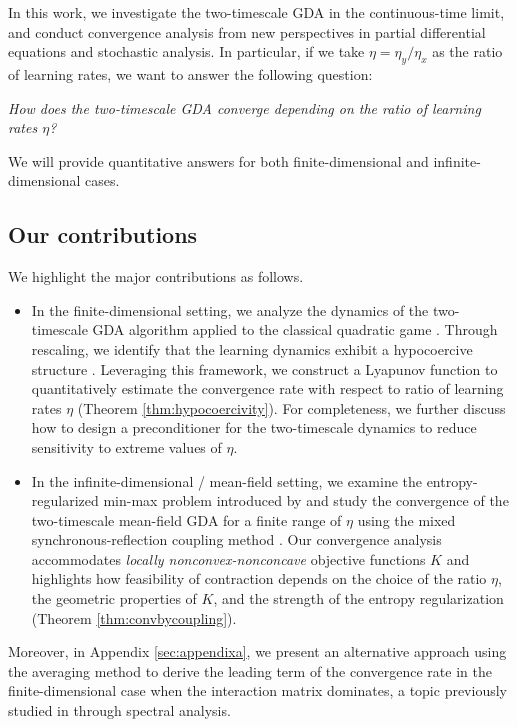 \documentclass[11pt]{article}
\newcommand{\1}{\mathds{1}}
\begin{document}
In this work, we investigate the two-timescale GDA in the continuous-time limit, and conduct convergence analysis from new perspectives in partial differential equations and stochastic analysis. In particular, if we take $\eta=\eta_y/\eta_x$ as the ratio of learning rates, we want to answer the following question:
\begin{center}
    \textit{How does the two-timescale GDA converge depending on the ratio of learning rates $\eta$?}
\end{center}
We will provide quantitative answers for both finite-dimensional and infinite-dimensional cases.
\subsection{Our contributions}
We highlight the major contributions as follows.
\begin{itemize}
    \item In the finite-dimensional setting, we analyze the dynamics of the two-timescale GDA algorithm applied to the classical quadratic game \cite{letcher2019differentiable}. Through rescaling, we identify that the learning dynamics exhibit a hypocoercive structure \cite{villani2009hypocoercivity}. Leveraging this framework, we construct a Lyapunov function to quantitatively estimate the convergence rate with respect to ratio of learning rates $\eta$ (Theorem \ref{thm:hypocoercivity}). For completeness, we further discuss how to design a preconditioner for the two-timescale dynamics to reduce sensitivity to extreme values of $\eta$.
    
    \item In the infinite-dimensional / mean-field setting, we examine the entropy-regularized min-max problem introduced by \cite{domingo2020mean} and study the convergence of the two-timescale mean-field GDA for a finite range of $\eta$ using the mixed synchronous-reflection coupling method \cite{eberle2016reflection}. Our convergence analysis accommodates \textit{locally nonconvex-nonconcave} objective functions $K$ and highlights how feasibility of contraction depends on the choice of the ratio $\eta$, the geometric properties of $K$, and the strength of the entropy regularization (Theorem \ref{thm:convbycoupling}).

\end{itemize}
Moreover, in Appendix \ref{sec:appendixa}, we present an alternative approach using the averaging method to derive the leading term of the convergence rate in the finite-dimensional case when the interaction matrix dominates, a topic previously studied in \cite{wang2024local} through spectral analysis.
\end{document}
